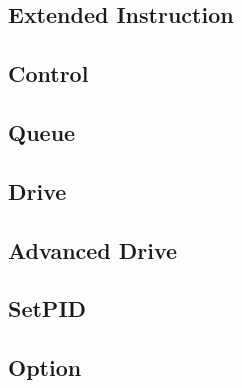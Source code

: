 \subsection{Extended Instruction}
\subsection{Control}
\subsection{Queue}
\subsection{Drive}
\subsection{Advanced Drive}
\subsection{SetPID}
\subsection{Option}
